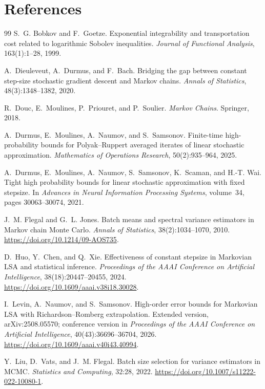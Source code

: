 \documentclass[11pt,a4paper,oneside]{report}
\numberwithin{equation}{chapter}
\begin{document}
\chapter{References}\label{sec:references}
\begin{thebibliography}{99}
S.~G. Bobkov and F.~Goetze.
Exponential integrability and transportation cost related to logarithmic
Sobolev inequalities. \emph{Journal of Functional Analysis}, 163(1):1--28,
1999.

A.~Dieuleveut, A.~Durmus, and F.~Bach.
Bridging the gap between constant step-size stochastic gradient descent and
Markov chains. \emph{Annals of Statistics}, 48(3):1348--1382, 2020.

R.~Douc, E.~Moulines, P.~Priouret, and P.~Soulier.
\emph{Markov Chains}. Springer, 2018.

A.~Durmus, E.~Moulines, A.~Naumov, and S.~Samsonov.
Finite-time high-probability bounds for Polyak--Ruppert averaged iterates of
linear stochastic approximation. \emph{Mathematics of Operations Research},
50(2):935--964, 2025.

A.~Durmus, E.~Moulines, A.~Naumov, S.~Samsonov, K.~Scaman, and H.-T. Wai.
Tight high probability bounds for linear stochastic approximation with fixed
stepsize. In \emph{Advances in Neural Information Processing Systems},
volume~34, pages 30063--30074, 2021.

J.~M. Flegal and G.~L. Jones.
Batch means and spectral variance estimators in Markov chain Monte Carlo.
\emph{Annals of Statistics}, 38(2):1034--1070, 2010.
\url{https://doi.org/10.1214/09-AOS735}.

D.~Huo, Y.~Chen, and Q.~Xie.
Effectiveness of constant stepsize in Markovian LSA and statistical inference.
\emph{Proceedings of the AAAI Conference on Artificial Intelligence},
38(18):20447--20455, 2024.
\url{https://doi.org/10.1609/aaai.v38i18.30028}.

I.~Levin, A.~Naumov, and S.~Samsonov.
High-order error bounds for Markovian LSA with Richardson--Romberg
extrapolation. Extended version, arXiv:2508.05570; conference version in
\emph{Proceedings of the AAAI Conference on Artificial Intelligence},
40(43):36696--36704, 2026.
\url{https://doi.org/10.1609/aaai.v40i43.40994}.

Y.~Liu, D.~Vats, and J.~M. Flegal.
Batch size selection for variance estimators in MCMC.
\emph{Statistics and Computing}, 32:28, 2022.
\url{https://doi.org/10.1007/s11222-022-10080-1}.


\end{thebibliography}
\end{document}
